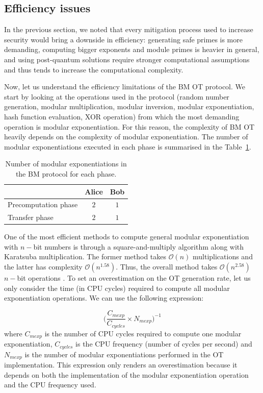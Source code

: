 \subsection{Efficiency issues}

In the previous section, we noted that every mitigation process used to increase security would bring a downside in efficiency: generating safe primes is more demanding, computing bigger exponents and module primes is heavier in general, and using post-quantum solutions require stronger computational assumptions and thus tends to increase the computational complexity. 

Now, let us understand the efficiency limitations of the BM OT protocol. We start by looking at the operations used in the protocol (random number generation, modular multiplication, modular inversion, modular exponentiation, hash function evaluation, XOR operation) from which the most demanding operation is modular exponentiation. For this reason, the complexity of BM OT heavily depends on the complexity of modular exponentiation. The number of modular exponentiations executed in each phase is summarised in the Table~\ref{table:BMOT_mexp}.


\begin{table}[h!]
\centering
\begin{tabular}{lcc}
\toprule
 & Alice & Bob \\
\midrule
\multicolumn{1}{l}{Precomputation phase}   & $2$  & $1$  \\
\multicolumn{1}{l}{Transfer phase} & $2$  & $1$\\
\bottomrule
\end{tabular}
\caption{Number of modular exponentiations in the BM protocol for each phase.}
\label{table:BMOT_mexp}
\end{table}

One of the most efficient methods to compute general modular exponentiation with $n-$bit numbers is through a square-and-multiply algorithm along with Karatsuba multiplication. The former method takes $\mathcal{O}(n)$ multiplications and the latter has complexity $\mathcal{O}(n^{1.58})$. Thus, the overall method takes $\mathcal{O}(n^{2.58})$ $n-$bit operations \cite{MVV01}. To set an overestimation on the OT generation rate, let us only consider the time (in CPU cycles) required to compute all modular exponentiation operations. We can use the following expression:

\begin{equation}
\label{eq:nOTs}
\Big( \frac{C_{mexp}}{C_{cycles}} \times N_{mexp} \Big)^{-1}
\end{equation}
where $C_{mexp}$ is the number of CPU cycles required to compute one modular exponentiation, $C_{cycles}$ is the CPU frequency (number of cycles per second) and $N_{mexp}$ is the number of modular exponentiations performed in the OT implementation. This expression only renders an overestimation because it depends on both the implementation of the modular exponentiation operation and the CPU frequency used. 

